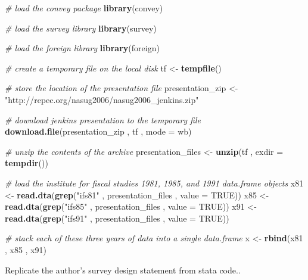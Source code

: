\documentclass[
]{book}
\newenvironment{Shaded}{\begin{snugshade}}{\end{snugshade}}
\newcommand{\AttributeTok}[1]{\textcolor[rgb]{0.13,0.29,0.53}{#1}}
\newcommand{\CommentTok}[1]{\textcolor[rgb]{0.56,0.35,0.01}{\textit{#1}}}
\newcommand{\ConstantTok}[1]{\textcolor[rgb]{0.56,0.35,0.01}{#1}}
\newcommand{\FunctionTok}[1]{\textcolor[rgb]{0.13,0.29,0.53}{\textbf{#1}}}
\newcommand{\NormalTok}[1]{#1}
\newcommand{\OtherTok}[1]{\textcolor[rgb]{0.56,0.35,0.01}{#1}}
\newcommand{\StringTok}[1]{\textcolor[rgb]{0.31,0.60,0.02}{#1}}
\begin{document}
\begin{Shaded}
\begin{Highlighting}[]
\CommentTok{\# load the convey package}
\FunctionTok{library}\NormalTok{(convey)}

\CommentTok{\# load the survey library}
\FunctionTok{library}\NormalTok{(survey)}

\CommentTok{\# load the foreign library}
\FunctionTok{library}\NormalTok{(foreign)}

\CommentTok{\# create a temporary file on the local disk}
\NormalTok{tf }\OtherTok{\textless{}{-}} \FunctionTok{tempfile}\NormalTok{()}

\CommentTok{\# store the location of the presentation file}
\NormalTok{presentation\_zip }\OtherTok{\textless{}{-}}
  \StringTok{"http://repec.org/nasug2006/nasug2006\_jenkins.zip"}

\CommentTok{\# download jenkins\textquotesingle{} presentation to the temporary file}
\FunctionTok{download.file}\NormalTok{(presentation\_zip , tf , }\AttributeTok{mode =} \StringTok{\textquotesingle{}wb\textquotesingle{}}\NormalTok{)}

\CommentTok{\# unzip the contents of the archive}
\NormalTok{presentation\_files }\OtherTok{\textless{}{-}} \FunctionTok{unzip}\NormalTok{(tf , }\AttributeTok{exdir =} \FunctionTok{tempdir}\NormalTok{())}

\CommentTok{\# load the institute for fiscal studies\textquotesingle{} 1981, 1985, and 1991 data.frame objects}
\NormalTok{x81 }\OtherTok{\textless{}{-}}
  \FunctionTok{read.dta}\NormalTok{(}\FunctionTok{grep}\NormalTok{(}\StringTok{"ifs81"}\NormalTok{ , presentation\_files , }\AttributeTok{value =} \ConstantTok{TRUE}\NormalTok{))}
\NormalTok{x85 }\OtherTok{\textless{}{-}}
  \FunctionTok{read.dta}\NormalTok{(}\FunctionTok{grep}\NormalTok{(}\StringTok{"ifs85"}\NormalTok{ , presentation\_files , }\AttributeTok{value =} \ConstantTok{TRUE}\NormalTok{))}
\NormalTok{x91 }\OtherTok{\textless{}{-}}
  \FunctionTok{read.dta}\NormalTok{(}\FunctionTok{grep}\NormalTok{(}\StringTok{"ifs91"}\NormalTok{ , presentation\_files , }\AttributeTok{value =} \ConstantTok{TRUE}\NormalTok{))}

\CommentTok{\# stack each of these three years of data into a single data.frame}
\NormalTok{x }\OtherTok{\textless{}{-}} \FunctionTok{rbind}\NormalTok{(x81 , x85 , x91)}
\end{Highlighting}
\end{Shaded}

Replicate the author's survey design statement from stata code..
\end{document}
